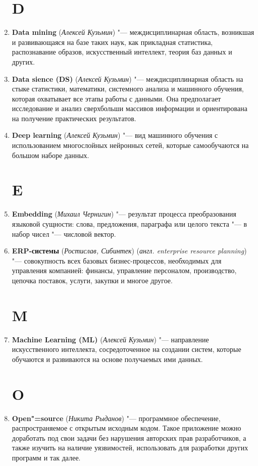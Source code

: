 \documentclass[14pt]{extarticle}
\begin{document}
\begin{enumerate}
    \section*{D}
    \item \textbf{Data mining} (\textit{Алексей Кузьмин}) "--- междисциплинарная область, возникшая и развивающаяся
    на базе таких наук, как прикладная статистика, распознавание образов, искусственный интеллект, теория
    баз данных и других.

    \item \textbf{Data sience (DS)} (\textit{Алексей Кузьмин}) "--- междисциплинарная область на стыке статистики, математики, системного анализа
    и машинного обучения, которая охватывает все этапы работы с данными. Она предполагает исследование и анализ сверхбольши
    массивов информации и ориентирована на получение практических результатов.

    \item \textbf{Deep learning} (\textit{Алексей Кузьмин}) "--- вид машинного обучения с использованием многослойных нейронных сетей, которые
    самообучаются на большом наборе данных.
    \section*{E}
    \item \textbf{Embedding} (\textit{Михаил Чернигин}) "---  результат процесса преобразования языковой сущности: слова, предложения, параграфа или целого текста "--- в набор чисел "--- числовой вектор.
    
    \item \textbf{ERP-системы} (\textit{Ростислав, Сибинтек}) (\textit{англ. enterprise resource planning}) "--- совокупность всех базовых бизнес-процессов, необходимых для управления компанией: финансы, управление персоналом, производство, цепочка поставок, услуги, закупки и многое другое.
    \section*{M}
    
    \item \textbf{Machine Learning (ML)} (\textit{Алексей Кузьмин}) "--- направление искусственного интеллекта, сосредоточенное на создании систем, которые обучаются и развиваются на основе получаемых ими данных.
    \section*{O}
    \item \textbf{Open"=source} (\textit{Никита Рыданов}) "--- программное обеспечение, распространяемое с открытым исходным кодом. Такое приложение можно доработать под свои задачи без нарушения авторских прав разработчиков, а также изучить на наличие уязвимостей, использовать для разработки других программ и так далее.

\end{enumerate}
\end{document}
